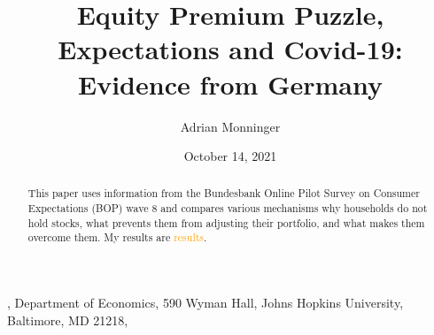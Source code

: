 \documentclass[ProjectABM]{subfiles}
\begin{document}
\providecommand{\versn}{pdf} %
\ifthenelse{\boolean{Web}}{    %
  \renewcommand{\versn}{Web}     %
  \renewcommand{\rootFromOut}{.} %
}{}  %


\title{Equity Premium Puzzle, Expectations and Covid-19:\\ Evidence from Germany}

\author{Adrian Monninger\authNum}




\renewcommand{\forcedate}{October 14, 2021}\date{\forcedate}

\maketitle
\hypertarget{abstract}{}
\begin{abstract}
This paper uses information from the Bundesbank Online Pilot Survey on Consumer Expectations (BOP) wave 8 and compares various mechanisms why households do not hold stocks, what prevents them from adjusting their portfolio, and what makes them overcome them. My results are \textcolor{orange}{results}.
\end{abstract}


\hypertarget{links}{}

\begin{authorsinfo}
  , Department of Economics, 590 Wyman Hall, Johns Hopkins University, Baltimore, MD 21218, 
\end{authorsinfo}

\newcommand{\thankstext}{
I am deeply indebted to the members of the Deutsche Bundesbank BOP team, in particular Tobias Schmidt, Stefan Ried, Olga Goldfayn-Frank and Misina Cato, as well as Chris Carroll, Annette Vissing-Jorgensen and my fellow students from the Johns Hopkins University. All errors are my own.}
\end{document}
